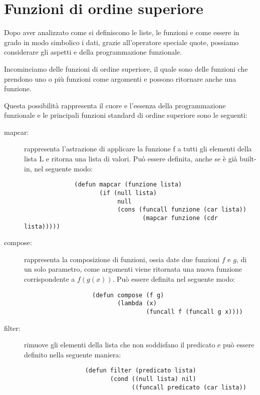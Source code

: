 \documentclass[a4paper]{book}
\begin{document}
\section{Funzioni di ordine superiore}
Dopo aver analizzato come si definiscono le liste, le funzioni e come essere in grado
in modo simbolico i dati, grazie all'operatore speciale quote, possiamo considerare
gli aspetti e  della programmazione funzionale.

Incominciamo delle funzioni di ordine superiore, il quale sono delle funzioni che
prendono uno o più funzioni come argomenti e possono ritornare anche una funzione.

Questa possibilità rappresenta il cuore e l'essenza della programmazione funzionale
e le principali funzioni standard di ordine superiore sono le seguenti:
\begin{description}
  \item [mapcar:] rappresenta l'astrazione di applicare la funzione f a tutti gli
         elementi della lista L e ritorna una lista di valori.
         Può essere definita, anche se è già built-in, nel seguente modo:
         \begin{verbatim}
              (defun mapcar (funzione lista)
                     (if (null lista)
                          null
                          (cons (funcall funzione (car lista))
                                 (mapcar funzione (cdr lista)))))
         \end{verbatim}
  \item [compose:] rappresenta la composizione di funzioni, ossia date due funzioni
                   $f$ e $g$, di un solo parametro, come argomenti viene ritornata
                   una nuova funzione corrispondente a $f(g(x))$.\newline
                   Può essere definita nel seguente modo:
                   \begin{verbatim}
                   (defun compose (f g)
                          (lambda (x)
                                  (funcall f (funcall g x))))
                   \end{verbatim}
  \item [filter:] rimuove gli elementi della lista che non soddisfano il predicato
                 e può essere definito nella seguente maniera:
                 \begin{verbatim}
                 (defun filter (predicato lista)
                        (cond ((null lista) nil)
                              ((funcall predicato (car lista))

\end{verbatim}
\end{description}
\end{document}
